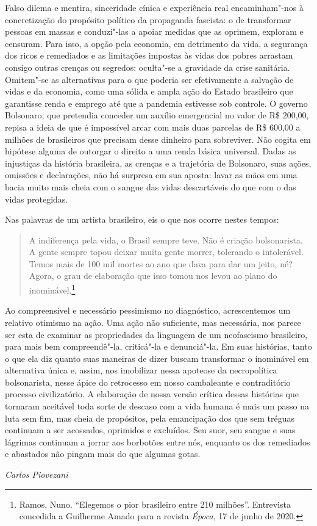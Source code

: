 Falso dilema e mentira, sinceridade cínica e experiência real
encaminham"-nos à concretização do propósito político da propaganda
fascista: o de transformar pessoas em massas e conduzi"-las a apoiar
medidas que as oprimem, exploram e censuram. Para isso, a opção pela
economia, em detrimento da vida, a segurança dos ricos e remediados e as
limitações impostas às vidas dos pobres arrastam consigo outras crenças
ou segredos: oculta"-se a gravidade da crise sanitária. Omitem"-se as
alternativas para o que poderia ser efetivamente a salvação de vidas e
da economia, como uma sólida e ampla ação do Estado brasileiro que
garantisse renda e emprego até que a pandemia estivesse sob controle. O
governo Bolsonaro, que pretendia conceder um auxílio emergencial no
valor de R\$ 200,00, repisa a ideia de que é impossível arcar com mais
duas parcelas de R\$ 600,00 a milhões de brasileiros que precisam desse
dinheiro para sobreviver. Não cogita em hipótese alguma de outorgar o
direito a uma renda básica universal. Dadas as injustiças da história
brasileira, as crenças e a trajetória de Bolsonaro, suas ações, omissões
e declarações, não há surpresa em sua aposta: lavar as mãos em uma bacia
muito mais cheia com o sangue das vidas descartáveis do que com o das
vidas protegidas.

Nas palavras de um artista brasileiro, eis o que nos ocorre nestes
tempos:

\begin{quote}
A indiferença pela vida, o Brasil sempre teve. Não é criação
bolsonarista. A gente sempre topou deixar muita gente morrer, tolerando
o intolerável. Temos mais de 100 mil mortes ao ano que dava para dar um
jeito, né? Agora, o grau de elaboração que isso tomou nos levou ao plano
do inominável.\footnote{Ramos, Nuno. ``Elegemos o pior brasileiro entre
  210 milhões''. Entrevista concedida a Guilherme Amado para a revista
  \emph{Época}, 17 de junho de 2020.}
\end{quote}

Ao compreensível e necessário pessimismo no diagnóstico, acrescentemos
um relativo otimismo na ação. Uma ação não suficiente, mas necessária,
nos parece ser esta de examinar as propriedades da linguagem de um
neofascismo brasileiro, para mais bem compreendê"-la, criticá"-la e
denunciá"-la. Em suas histórias, tanto o que ela diz quanto suas maneiras
de dizer buscam transformar o inominável em alternativa única e, assim,
nos imobilizar nessa apoteose da necropolítica bolsonarista, nesse ápice
do retrocesso em nosso cambaleante e contraditório processo
civilizatório. A elaboração de nossa versão crítica dessas histórias que
tornaram aceitável toda sorte de descaso com a vida humana é mais um
passo na luta sem fim, mas cheia de propósitos, pela emancipação dos que
sem tréguas continuam a ser acossados, oprimidos e excluídos. Seu suor,
seu sangue e suas lágrimas continuam a jorrar aos borbotões entre nós,
enquanto os dos remediados e abastados não pingam mais do que algumas
gotas.

\bigskip

\begin{flushright}
\textit{Carlos Piovezani}
\end{flushright}


